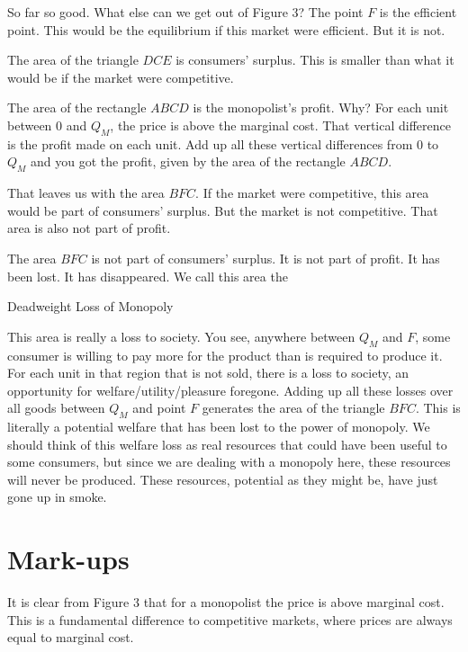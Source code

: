 \documentclass[
]{book}
\begin{document}
So far so good. What else can we get out of Figure 3?
The point \(F\) is the efficient point. This would be the equilibrium if this market were efficient. But it is not.

The area of the triangle \(DCE\) is consumers' surplus. This is smaller than what it would be if the market were competitive.

The area of the rectangle \(ABCD\) is the monopolist's profit. Why? For each unit between \(0\) and \(Q_M\), the price is above the marginal cost. That vertical difference is the profit made on each unit. Add up all these vertical differences from \(0\) to \(Q_M\) and you got the profit, given by the area of the rectangle \(ABCD\).

That leaves us with the area \(BFC\). If the market were competitive, this area would be part of consumers' surplus. But the market is not competitive. That area is also not part of profit.

The area \(BFC\) is not part of consumers' surplus. It is not part of profit. It has been lost. It has disappeared. We call this area the

\begin{center}
Deadweight Loss of Monopoly

\end{center}

This area is really a loss to society. You see, anywhere between \(Q_M\) and \(F\), some consumer is willing to pay more for the product than is required to produce it. For each unit in that region that is not sold, there is a loss to society, an opportunity for welfare/utility/pleasure foregone. Adding up all these losses over all goods between \(Q_M\) and point \(F\) generates the area of the triangle \(BFC\). This is literally a potential welfare that has been lost to the power of monopoly. We should think of this welfare loss as real resources that could have been useful to some consumers, but since we are dealing with a monopoly here, these resources will never be produced. These resources, potential as they might be, have just gone up in smoke.

\hypertarget{mark-ups}{%
\section{Mark-ups}\label{mark-ups}}

It is clear from Figure 3 that for a monopolist the price is above marginal cost. This is a fundamental difference to competitive markets, where prices are always equal to marginal cost.
\end{document}
